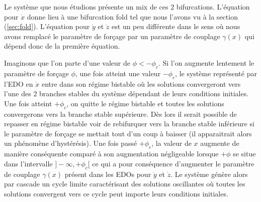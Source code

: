 Le système que nous étudions présente un mix de ces 2 bifurcations. L'équation pour $\dot{x}$ donne lieu à une bifurcation fold tel que nous l'avons vu à la section (\ref{sec:fold}). L'équation pour $\dot{y}$ et $\dot{z}$ est un peu différente dans le sens où nous avons remplacé le paramètre de forçage par un paramètre de couplage $\gamma(x)$ qui dépend donc de la première équation.

Imaginons que l’on parte d’une valeur de $\phi < - \phi_c$. Si l’on augmente lentement le paramètre de forçage $\phi$, une fois atteint une valeur $-\phi_c$, le système représenté par l’EDO en $\dot{x}$ entre dans son régime bistable où les solutions convergeront vers l’une des 2 branches stables du système dépendant de leurs conditions initiales. Une fois atteint $+\phi_c$, on quitte le régime bistable et toutes les solutions convergerons vers la branche stable supérieure. Dès lors il serait possible de repasser en régime bistable voir de rebifurquer vers la branche stable inférieure si le paramètre de forçage se mettait tout d’un coup à baisser (il apparaitrait alors un phénomène d’hystérésis). Une fois passé $+\phi_c$, la valeur de $x$ augmente de manière conséquente comparé à son augmentation négligeable lorsque $+\phi$ se situe dans l’intervalle $]-\infty, +\phi_c[$ ce qui a pour conséquence d’augmenter le paramètre de couplage $\gamma(x)$ présent dans les EDOs pour $\dot{y}$ et $\dot{z}$.  Le système génère alors par cascade un cycle limite caractérisant des solutions oscillantes où toutes les solutions convergent vers ce cycle peut importe leurs conditions initiales.
